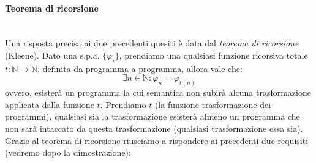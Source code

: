 \documentclass{article}
\begin{document}
\paragraph{Teorema di ricorsione}\mbox{}\\
Una risposta precisa ai due precedenti quesiti è data dal \textit{teorema di ricorsione} (Kleene).
Dato una s.p.a. $\{\varphi_i\}$, prendiamo una qualsiasi funzione ricorsiva totale $t:\mathbb{N}\rightarrow\mathbb{N}$,
 definita da programma a programma, allora vale che:
$$\exists n\in\mathbb{N}:\varphi_n=\varphi_{t(n)}$$
ovvero, esisterà un programma la cui semantica non subirà alcuna trasformazione applicata dalla funzione
$t$. Prendiamo $t$ (la funzione trasformazione dei programmi), qualsiasi sia la trasformazione esisterà
almeno un programma che non sarà intaccato da questa trasformazione (qualsiasi trasformazione essa sia).
\newline\newline
Grazie al teorema di ricorsione riusciamo a rispondere ai precedenti due requisiti (vedremo
dopo la dimostrazione):
\end{document}
